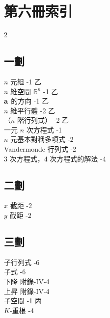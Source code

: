\section*{第六冊\quad 索\qquad 引}\label{sec:b6-app1}

\begin{multicols}{2}

\subsection*{一\quad 劃}
\noindent
$n$ 元組 -1 乙\\
$n$ 維空間 $\mathbb{R}^n$ -1 乙\\
$\boldsymbol{\mathbf{a}}$ 的方向 -1 乙\\
$n$ 維平行體 -2 乙\\
（$n$ 階行列式） -2 乙\\
一元 $n$ 次方程式 -1\\
$n$ 元基本對稱多項式 -2\\
Vandermonde 行列式 -2\\
3 次方程式，4 次方程式的解法 -4

\subsection*{二\quad 劃}
\noindent
$x$ 截距 -2\\
$y$ 截距 -2

\subsection*{三\quad 劃}
\noindent
子行列式 -6\\
子式 -6\\
下降 \dotfill 附錄-IV-4\\
上昇 \dotfill 附錄-IV-4\\
子空間 -1 丙\\
$K$-重根 -4


\end{multicols}
